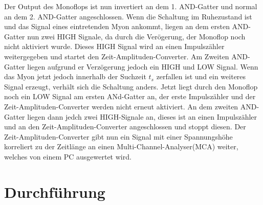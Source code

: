     Der Output des Monoflops ist nun invertiert an dem 1. AND-Gatter und normal an dem 2. AND-Gatter angeschlossen.
    Wenn die Schaltung im Ruhezustand ist und das Signal eines eintretenden Myon ankommt, liegen an dem ersten AND-Gatter nun zwei HIGH Signale, da durch die Verögerung, der Monoflop noch nicht aktiviert wurde.
    Dieses HIGH Signal wird an einen Impulszähler weitergegeben und startet den Zeit-Amplituden-Converter.
    Am Zweiten AND-Gatter liegen aufgrund er Verzögerung jedoch ein HIGH und LOW Signal.
    Wenn das Myon jetzt jedoch innerhalb der Suchzeit $t_s$ zerfallen ist und ein weiteres Signal erzeugt, verhält sich die Schaltung anders.
    Jetzt liegt durch den Monoflop noch ein LOW Signal am ersten ANd-Gatter an, der erste Impulszähler und der Zeit-Amplituden-Converter werden nicht erneut aktiviert.
    An dem zweiten AND-Gatter liegen dann jedch zwei HIGH-Signale an, dieses ist an einen Impulszähler und an den Zeit-Amplituden-Converter angeschlossen und stoppt diesen.
    Der Zeit-Amplituden-Converter gibt nun ein Signal mit einer Spannungshöhe korreliert zu der Zeitlänge an einen Multi-Channel-Analyser(MCA) weiter, welches von einem PC ausgewertet wird.

\section{Durchführung}
	
